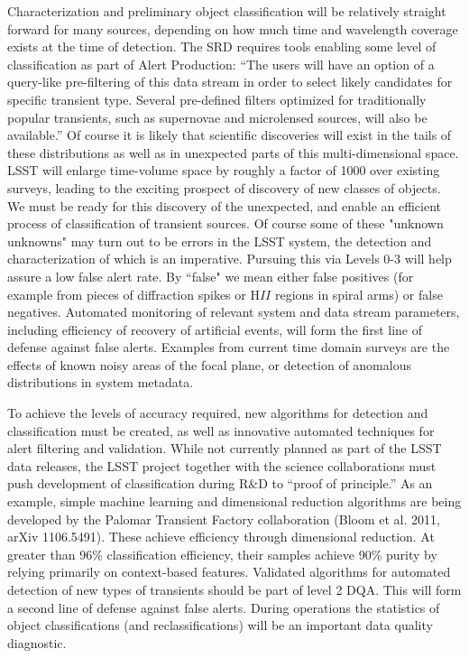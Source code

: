 \documentclass[SE,toc]{lsstdoc}
\begin{document}
Characterization and preliminary object classification will be relatively straight forward for many sources, depending on how much time and wavelength coverage exists at the time of detection. The SRD requires tools enabling some level of classification as part of Alert Production:  ``The users will have an option of a query-like pre-filtering of this data stream in order to select likely candidates for specific transient type. Several pre-defined filters optimized for traditionally popular transients, such as supernovae and microlensed sources, will also be available.''  Of course it is likely that scientific discoveries will exist in the tails of these distributions as well as in unexpected parts of this multi-dimensional space.  LSST will enlarge time-volume space by roughly a factor of 1000 over existing surveys, leading to the exciting prospect of discovery of new classes of objects.  We must be ready for this discovery of the unexpected, and enable an efficient process of classification of transient sources.  Of course some of these "unknown unknowns" may turn out to be errors in the LSST system, the detection and characterization of which is an imperative.  Pursuing this via Levels 0-3 will help assure a low false alert rate. By ``false" we mean either false positives (for example from pieces of diffraction spikes or H$II$ regions in spiral arms) or false negatives. Automated monitoring of relevant system and data stream parameters, including efficiency of recovery of artificial events, will form the first line of defense against false alerts. Examples from current time domain surveys are the effects of known noisy areas of the focal plane, or detection of anomalous distributions in system metadata.

To achieve the levels of accuracy required, new algorithms for detection and classification must be created, as well as innovative automated techniques for alert filtering and validation.  While not currently planned as part of the LSST data releases, the LSST project together with the science collaborations must push development of classification during R\&D to ``proof of principle.''  As an example, simple machine learning and dimensional reduction algorithms are being developed by the Palomar Transient Factory collaboration (Bloom et al. 2011, arXiv 1106.5491).  These achieve efficiency through dimensional reduction. At greater than 96\% classification efficiency, their samples achieve 90\% purity by relying primarily on context-based features. Validated algorithms for automated detection of new types of transients should be part of level 2 DQA. This will form a second line of defense against false alerts. During operations the statistics of object classifications (and reclassifications) will be an important data quality diagnostic.
\end{document}
